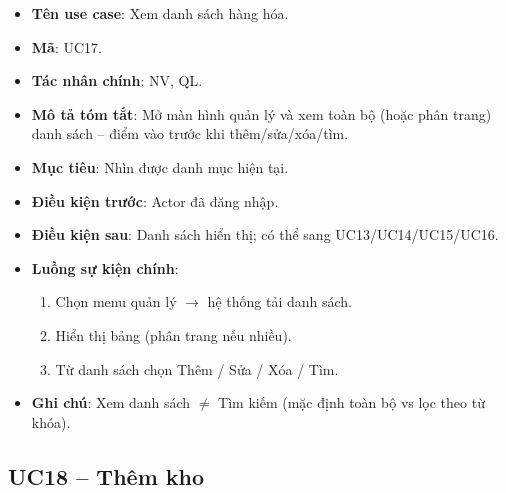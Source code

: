\begin{itemize}[leftmargin=1.5cm]
    \item \textbf{Tên use case}: Xem danh sách hàng hóa.
    \item \textbf{Mã}: UC17.
    \item \textbf{Tác nhân chính}: NV, QL.
    \item \textbf{Mô tả tóm tắt}: Mở màn hình quản lý và xem toàn bộ (hoặc phân trang) danh sách -- điểm vào trước khi thêm/sửa/xóa/tìm.
    \item \textbf{Mục tiêu}: Nhìn được danh mục hiện tại.
    \item \textbf{Điều kiện trước}: Actor đã đăng nhập.
    \item \textbf{Điều kiện sau}: Danh sách hiển thị; có thể sang UC13/UC14/UC15/UC16.
    \item \textbf{Luồng sự kiện chính}:
    \begin{enumerate}
        \item Chọn menu quản lý $\rightarrow$ hệ thống tải danh sách.
        \item Hiển thị bảng (phân trang nếu nhiều).
        \item Từ danh sách chọn Thêm / Sửa / Xóa / Tìm.
    \end{enumerate}
    \item \textbf{Ghi chú}: Xem danh sách $\neq$ Tìm kiếm (mặc định toàn bộ vs lọc theo từ khóa).
\end{itemize}


\subsection{UC18 -- Thêm kho}

